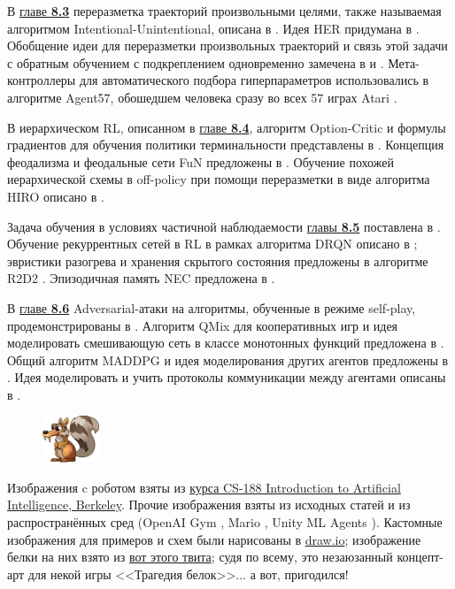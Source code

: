 В \underline{главе \textbf{8.3}} переразметка траекторий произвольными целями, также называемая алгоритмом Intentional-Unintentional, описана в \cite{cabi2017intentional}. Идея HER придумана в \cite{andrychowicz2017hindsight}. Обобщение идеи для переразметки произвольных траекторий и связь этой задачи с обратным обучением с подкреплением одновременно замечена в \cite{eysenbach2020rewriting} и \cite{li2020generalized}. Мета-контроллеры для автоматического подбора гиперпараметров использовались в алгоритме Agent57, обошедшем человека сразу во всех 57 играх Atari \cite{badia2020agent57}.

В иерархическом RL, описанном в \underline{главе \textbf{8.4}}, алгоритм Option-Critic и формулы градиентов для обучения политики терминальности представлены в \cite{bacon2017option}. Концепция феодализма и феодальные сети FuN предложены в \cite{vezhnevets2017feudal}. Обучение похожей иерархической схемы в off-policy при помощи переразметки в виде алгоритма HIRO описано в \cite{nachum2018data}.

Задача обучения в условиях частичной наблюдаемости \underline{главы \textbf{8.5}}  поставлена в \cite{smallwood1973optimal}. Обучение рекуррентных сетей в RL в рамках алгоритма DRQN описано в \cite{hausknecht2015deep}; эвристики разогрева и хранения скрытого состояния предложены в алгоритме R2D2 \cite{horgan2018distributed}. Эпизодичная память NEC предложена в \cite{pritzel2017neural}.

В \underline{главе \textbf{8.6}} Adversarial-атаки на алгоритмы, обученные в режиме self-play, продемонстрированы в \cite{gleave2019adversarial}. Алгоритм QMix для кооперативных игр и идея моделировать смешивающую сеть в классе монотонных функций предложена в \cite{rashid2018qmix}. Общий алгоритм MADDPG и идея моделирования других агентов предложены в \cite{lowe2017multi}. Идея моделировать и учить протоколы коммуникации между агентами описаны в \cite{foerster2016learning}.

\begin{figure}
\vspace{-0.25cm}
\centering
\includegraphics[width=0.15\textwidth]{Images/Scrat.png}
\vspace{-0.5cm}
\end{figure}

Изображения c роботом взяты из \href{https://inst.eecs.berkeley.edu/~cs188/fa20/}{курса CS-188 Introduction to Artificial Intelligence, Berkeley}. Прочие изображения взяты из исходных статей и из распространённых сред (OpenAI Gym \cite{brockman2016openai}, Mario \cite{gym-super-mario-bros}, Unity ML Agents \cite{juliani2018unity}). Кастомные изображения для примеров и схем были нарисованы в \href{https://www.draw.io/}{draw.io}; изображение белки на них взято из \href{https://twitter.com/racefornuts/status/690043558208913408}{вот этого твита}; судя по всему, это незаюзанный концепт-арт для некой игры <<Трагедия белок>>... а вот, пригодился!

